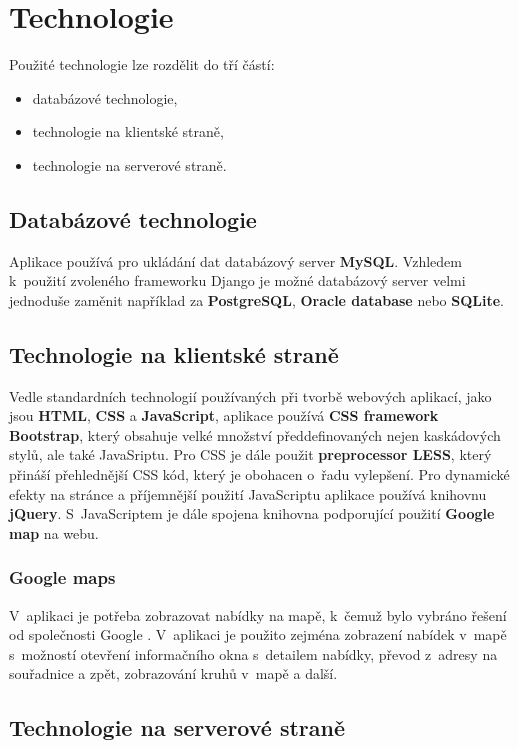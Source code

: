 \section{Technologie}
Použité technologie lze rozdělit do tří částí:
\begin{itemize}
    \item databázové technologie,
    \item technologie na klientské straně,
    \item technologie na serverové straně.
\end{itemize}

\subsection{Databázové technologie}
Aplikace používá pro ukládání dat databázový server \textbf{MySQL}. Vzhledem k~použití zvoleného frameworku Django je možné databázový server velmi jednoduše zaměnit například za \textbf{PostgreSQL}, \textbf{Oracle database} nebo \mbox{\textbf{SQLite}}.

\subsection{Technologie na klientské straně}
Vedle standardních technologií používaných při tvorbě webových aplikací, jako jsou \textbf{HTML}, \textbf{CSS} a \textbf{JavaScript}, aplikace používá \textbf{CSS framework Bootstrap}, který obsahuje velké množství předdefinovaných nejen kaskádových stylů, ale také JavaSriptu. Pro CSS je dále použit \textbf{preprocessor LESS}, který přináší přehlednější CSS kód, který je obohacen o~řadu vylepšení. Pro dynamické efekty na stránce a příjemnější použití JavaScriptu aplikace používá knihovnu \textbf{jQuery}. S~JavaScriptem je dále spojena knihovna podporující použití \textbf{Google map} na webu.

\subsubsection{Google maps}
V~aplikaci je potřeba zobrazovat nabídky na mapě, k~čemuž bylo vybráno řešení od společnosti Google \cite{googlemaps}. V~aplikaci je použito zejména zobrazení nabídek v~mapě s~možností otevření informačního okna s~detailem nabídky, převod z~adresy na souřadnice a zpět, zobrazování kruhů v~mapě a další.

\subsection{Technologie na serverové straně}

